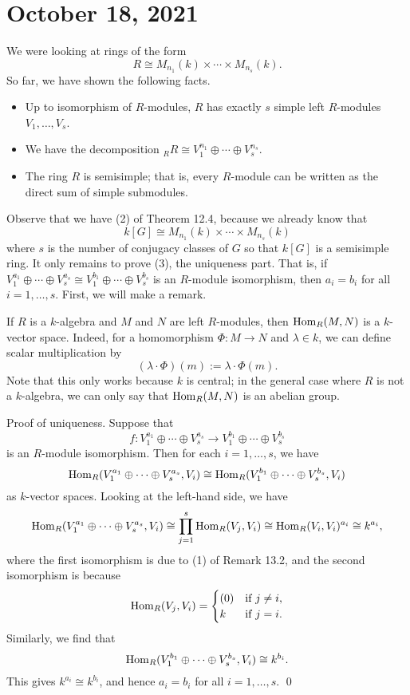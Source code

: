 \section{October 18, 2021}
We were looking at rings of the form 
\[ R \cong M_{n_1}(k) \times \cdots \times M_{n_s}(k). \] 
So far, we have shown the following facts. 
\begin{itemize}
    \item Up to isomorphism of $R$-modules, $R$ has exactly $s$ simple left 
    $R$-modules $V_1, \dots, V_s$. 
    \item We have the decomposition ${}_R R \cong V_1^{n_1} \oplus \cdots 
    \oplus V_s^{n_s}$. 
    \item The ring $R$ is semisimple; that is, every $R$-module can be 
    written as the direct sum of simple submodules. 
\end{itemize}

Observe that we have (2) of Theorem 12.4, because we already know that 
\[ k[G] \cong M_{n_1}(k) \times \cdots \times M_{n_s}(k) \] 
where $s$ is the number of conjugacy classes of $G$ so that $k[G]$ is a 
semisimple ring. It only remains to prove (3), the uniqueness part.
That is, if $V_1^{a_1} \oplus \cdots \oplus V_s^{a_s} \cong V_1^{b_1} 
\oplus \cdots \oplus V_s^{b_s}$ is an $R$-module isomorphism, then 
$a_i = b_i$ for all $i = 1, \dots, s$. First, we will make a remark. 

\begin{remark}
    If $R$ is a $k$-algebra and $M$ and $N$ are left $R$-modules, then 
    $\operatorname{Hom}_R(M, N)$ is a $k$-vector space. Indeed, for a homomorphism 
    $\Phi : M \to N$ and $\lambda \in k$, we can define scalar multiplication by 
    \[ (\lambda \cdot \Phi)(m) := \lambda \cdot \Phi(m). \] 
    Note that this only works because $k$ is central; in the general case where 
    $R$ is not a $k$-algebra, we can only say that $\operatorname{Hom}_R(M, N)$ is an abelian 
    group. 
\end{remark}

{\sc Proof of uniqueness.} Suppose that 
\[ f : V_1^{a_1} \oplus \cdots \oplus V_s^{a_s} \to V_1^{b_1} \oplus \cdots 
\oplus V_s^{b_s} \] 
is an $R$-module isomorphism. Then for each $i = 1, \dots, s$, we have 
\[ \operatorname{Hom}_R(V_1^{a_1} \oplus \cdots \oplus V_s^{a_s}, V_i) 
\cong \operatorname{Hom}_R(V_1^{b_1} \oplus \cdots \oplus V_s^{b_s}, V_i) \] 
as $k$-vector spaces. Looking at the left-hand side, we have 
\[ \operatorname{Hom}_R(V_1^{a_1} \oplus \cdots \oplus V_s^{a_s}, V_i) 
\cong \prod_{j=1}^s \operatorname{Hom}_R(V_j, V_i) \cong \operatorname{Hom}_R(V_i, V_i)^{a_i} \cong k^{a_i}, \] 
where the first isomorphism is due to (1) of Remark 13.2, and the second isomorphism
is because 
\[ \operatorname{Hom}_R(V_j, V_i) = \begin{cases} (0) & \text{if } j \neq i, \\ 
    k & \text{if } j = i. \end{cases} \] 
Similarly, we find that 
\[ \operatorname{Hom}_R(V_1^{b_1} \oplus \cdots \oplus V_s^{b_s}, V_i) \cong k^{b_i}. \] 
This gives $k^{a_i} \cong k^{b_i}$, and hence $a_i = b_i$ for all $i = 1, \dots, s$. \qed


